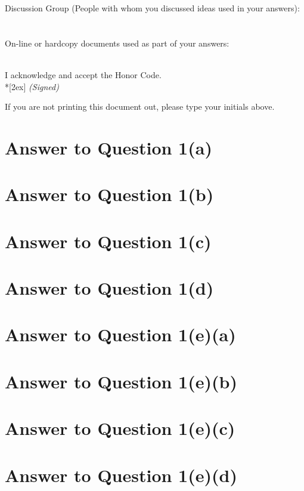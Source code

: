 \documentclass[11pt]{article}
\begin{document}
Discussion Group (People with whom you discussed ideas used in your answers): \\\\\\
On-line or hardcopy documents used as part of your answers: \\\\
\vfill

I acknowledge and accept the Honor Code.\\*[2ex]
\bigskip
\textit{(Signed)}\hrulefill

If you are not printing this document out, please type your initials above.

\vfill
\vfill

\pagebreak[4]
\section*{Answer to Question 1(a)}

\section*{Answer to Question 1(b)}

\section*{Answer to Question 1(c)}

\section*{Answer to Question 1(d)}

\section*{Answer to Question 1(e)(a)}

\section*{Answer to Question 1(e)(b)}

\section*{Answer to Question 1(e)(c)}

\section*{Answer to Question 1(e)(d)}
\end{document}
